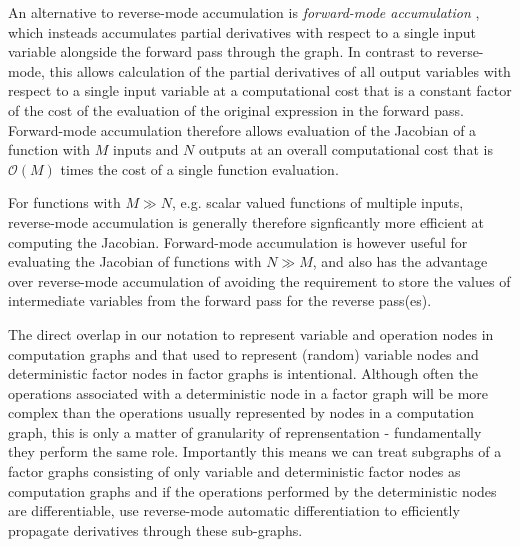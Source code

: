 An alternative to reverse-mode accumulation is \emph{forward-mode accumulation} \citep{wengert1964simple}, which insteads accumulates partial derivatives with respect to a single input variable alongside the forward pass through the graph. In contrast to reverse-mode, this allows calculation of the partial derivatives of all output variables with respect to a single input variable at a computational cost that is a constant factor of the cost of the evaluation of the original expression in the forward pass. Forward-mode accumulation therefore allows evaluation of the Jacobian of a function with $M$ inputs and $N$ outputs at an overall computational cost that is $\mathcal{O}(M)$ times the cost of a single function evaluation. 

For functions with $M \gg N$, e.g. scalar valued functions of multiple inputs, reverse-mode accumulation is generally therefore signficantly more efficient at computing the Jacobian. Forward-mode accumulation is however useful for evaluating the Jacobian of functions with $N \gg M$, and also has the advantage over reverse-mode accumulation of avoiding the requirement to store the values of intermediate variables from the forward pass for the reverse pass(es).



The direct overlap in our notation to represent variable and operation nodes in computation graphs and that used to represent (random) variable nodes and deterministic factor nodes in factor graphs is intentional. Although often the operations associated with a deterministic node in a factor graph will be more complex than the operations usually represented by nodes in a computation graph, this is only a matter of granularity of reprensentation - fundamentally they perform the same role. Importantly this means we can treat subgraphs of a factor graphs consisting of only variable and deterministic factor nodes as computation graphs and if the operations performed by the deterministic nodes are differentiable, use reverse-mode automatic differentiation to efficiently propagate derivatives through these sub-graphs.

